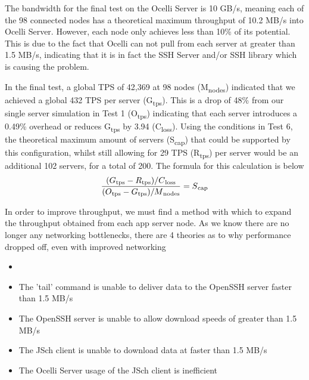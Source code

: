 \documentclass{llncs}
\begin{document}
The bandwidth for the final test on the Ocelli Server is 10 GB/s, meaning each of the 98 connected nodes has a theoretical maximum throughput of 10.2 MB/s into Ocelli Server. However, each node only achieves less than 10\% of its potential. This is due to the fact that Ocelli can not pull from each server at greater than 1.5 MB/s, indicating that it is in fact the SSH Server and/or SSH library which is causing the problem.

In the final test, a global TPS of 42,369 at 98 nodes (M\textsubscript{nodes}) indicated that we achieved a global 432 TPS per server (G\textsubscript{tps}). This is a drop of 48\% from our single server simulation in Test 1 (O\textsubscript{tps}) indicating that each server introduces a 0.49\% overhead or reduces G\textsubscript{tps} by 3.94 (C\textsubscript{loss}). Using the conditions in Test 6, the theoretical maximum amount of servers (S\textsubscript{cap}) that could be supported by this configuration, whilst still allowing for 29 TPS (R\textsubscript{tps}) per server would be an additional 102 servers, for a total of 200. The formula for this calculation is below
\\
\begin{align}
\dfrac{ (G\textsubscript{tps} - R\textsubscript{tps}) / C\textsubscript{loss}}{ (O\textsubscript{tps} - G\textsubscript{tps}) / M\textsubscript{nodes}} = S\textsubscript{cap}
\end{align}

In order to improve throughput, we must find a method with which to expand the throughput obtained from each app server node. As we know there are no longer any networking bottlenecks, there are 4 theories as to why performance dropped off, even with improved networking

\begin{itemize}
\item 
\item The 'tail' command is unable to deliver data to the OpenSSH server faster than 1.5 MB/s
\item The OpenSSH server is unable to allow download speeds of greater than 1.5 MB/s
\item The JSch client is unable to download data at faster than 1.5 MB/s
\item The Ocelli Server usage of the JSch client is inefficient
\end{itemize}
\end{document}
